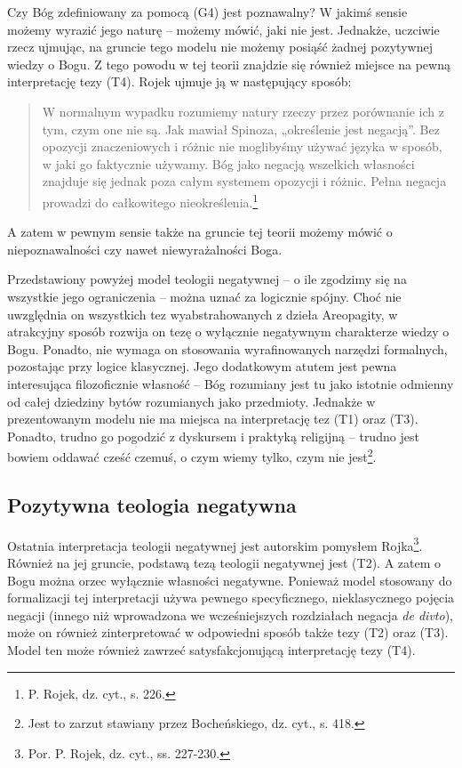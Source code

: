 Czy Bóg zdefiniowany za pomocą (G4) jest poznawalny? W jakimś sensie
możemy wyrazić jego naturę -- możemy mówić, jaki nie jest. Jednakże,
uczciwie rzecz ujmując, na gruncie tego modelu  nie możemy posiąść
żadnej pozytywnej wiedzy o Bogu. Z tego powodu w tej teorii znajdzie
się również miejsce na pewną interpretację tezy (T4). Rojek ujmuje ją w
następujący sposób:



\begin{quote}
    W normalnym wypadku rozumiemy natury rzeczy przez porównanie ich z tym,
czym one nie są. Jak mawiał Spinoza, „określenie jest negacją”. Bez
opozycji znaczeniowych i różnic nie moglibyśmy używać języka w sposób,
w jaki go faktycznie używamy. Bóg jako negacją wszelkich własności
znajduje się jednak poza całym systemem opozycji i różnic. Pełna
negacja prowadzi do całkowitego nieokreślenia.\footnote{P. Rojek, dz.
cyt., s. 226. }
\end{quote}




A zatem w pewnym sensie także na gruncie tej teorii możemy mówić o
niepoznawalności czy nawet niewyrażalności Boga.

Przedstawiony powyżej model teologii negatywnej -- o ile zgodzimy się na
wszystkie jego ograniczenia -- można uznać za logicznie spójny. Choć nie
uwzględnia on wszystkich tez wyabstrahowanych z dzieła Areopagity, w
atrakcyjny sposób rozwija on tezę o wyłącznie negatywnym charakterze
wiedzy o Bogu. Ponadto, nie wymaga on stosowania wyrafinowanych
narzędzi formalnych, pozostając przy logice klasycznej. Jego dodatkowym
atutem jest pewna interesująca filozoficznie własność -- Bóg rozumiany
jest tu jako istotnie odmienny od całej dziedziny bytów rozumianych
jako przedmioty. Jednakże w prezentowanym modelu nie ma miejsca na
interpretację tez (T1) oraz (T3). Ponadto, trudno go pogodzić z
dyskursem i praktyką religijną -- trudno jest bowiem oddawać cześć
czemuś, o czym wiemy tylko, czym nie jest\footnote{Jest to zarzut
stawiany przez Bocheńskiego, dz. cyt., s. 418. }.



\subsection{Pozytywna teologia negatywna}

Ostatnia interpretacja teologii negatywnej jest autorskim pomysłem
Rojka\footnote{Por. P. Rojek, dz. cyt., ss. 227-230. }. Również na
jej gruncie, podstawą tezą teologii negatywnej jest (T2). A zatem o
Bogu można orzec wyłącznie własności negatywne. Ponieważ model
stosowany do formalizacji tej interpretacji używa pewnego
specyficznego, nieklasycznego pojęcia negacji (innego niż wprowadzona
we wcześniejszych rozdziałach negacja \textit{de divto}), może on
również zinterpretować w odpowiedni sposób także tezy (T2) oraz (T3).
Model ten może również zawrzeć satysfakcjonującą interpretację tezy
(T4).

